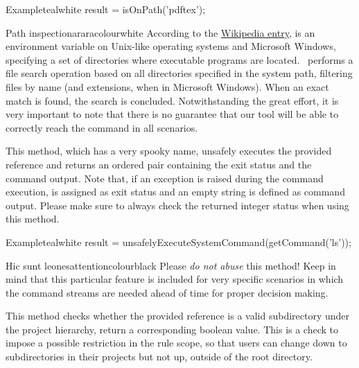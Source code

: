 \begin{description}
\begin{codebox}{Example}{teal}{\icnote}{white}
result = isOnPath('pdftex');
\end{codebox}

\begin{messagebox}{Path inspection}{araracolour}{\icok}{white}
According to the \href{https://en.wikipedia.org/wiki/PATH_(variable)}{Wikipedia entry},  is an environment variable on Unix-like operating systems and Microsoft Windows, specifying a set of directories where executable programs are located. \arara\ performs a file search operation based on all directories specified in the system path, filtering files by name (and extensions, when in Microsoft Windows). When an exact match is found, the search is concluded. Notwithstanding the great effort, it is very important to note that there is no guarantee that our tool will be able to correctly reach the command in all scenarios.
\end{messagebox}

\item[\mdbox{R}{unsafelyExecuteSystemCommand(Command command)}{Pair<Integer, String>}] This method, which has a very spooky name, unsafely executes the provided  reference and returns an ordered pair containing the exit status and the command output. Note that, if an exception is raised during the command execution,  is assigned as exit status and an empty string is defined as command output. Please make sure to always check the returned integer status when using this method.

\begin{codebox}{Example}{teal}{\icnote}{white}
result = unsafelyExecuteSystemCommand(getCommand('ls'));
\end{codebox}

\begin{messagebox}{Hic sunt leones}{attentioncolour}{\icattention}{black}
Please \emph{do not abuse} this method! Keep in mind that this particular feature is included for very specific scenarios in which the command streams are needed ahead of time for proper decision making.
\end{messagebox}

\item[\mdbox{R}{isSubdirectory(File directory)}{boolean}] This method checks whether the provided  reference is a valid subdirectory under the project hierarchy, return a corresponding boolean value. This is a check to impose a possible restriction in the rule scope, so that users can change down to subdirectories in their projects but not up, outside of the root directory.


\end{description}
